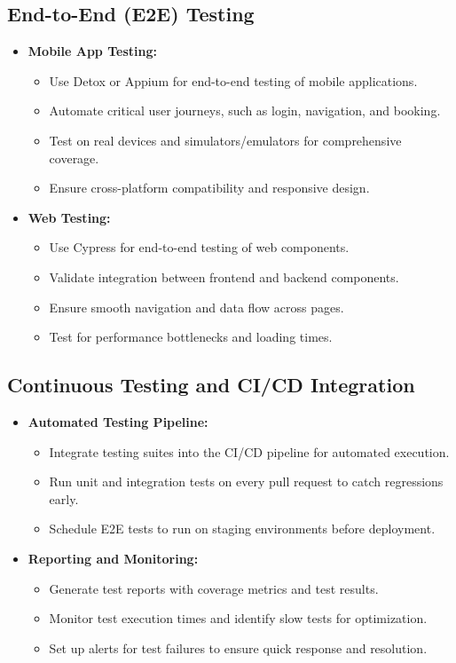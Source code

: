 \subsection{End-to-End (E2E) Testing}
\begin{itemize}[leftmargin=*]
    \item \textbf{Mobile App Testing:}
    \begin{itemize}
        \item Use Detox or Appium for end-to-end testing of mobile applications.
        \item Automate critical user journeys, such as login, navigation, and booking.
        \item Test on real devices and simulators/emulators for comprehensive coverage.
        \item Ensure cross-platform compatibility and responsive design.
    \end{itemize}
    
    \item \textbf{Web Testing:}
    \begin{itemize}
        \item Use Cypress for end-to-end testing of web components.
        \item Validate integration between frontend and backend components.
        \item Ensure smooth navigation and data flow across pages.
        \item Test for performance bottlenecks and loading times.
    \end{itemize}
\end{itemize}

\subsection{Continuous Testing and CI/CD Integration}
\begin{itemize}[leftmargin=*]
    \item \textbf{Automated Testing Pipeline:}
    \begin{itemize}
        \item Integrate testing suites into the CI/CD pipeline for automated execution.
        \item Run unit and integration tests on every pull request to catch regressions early.
        \item Schedule E2E tests to run on staging environments before deployment.
    \end{itemize}
    
    \item \textbf{Reporting and Monitoring:}
    \begin{itemize}
        \item Generate test reports with coverage metrics and test results.
        \item Monitor test execution times and identify slow tests for optimization.
        \item Set up alerts for test failures to ensure quick response and resolution.
    \end{itemize}
\end{itemize}